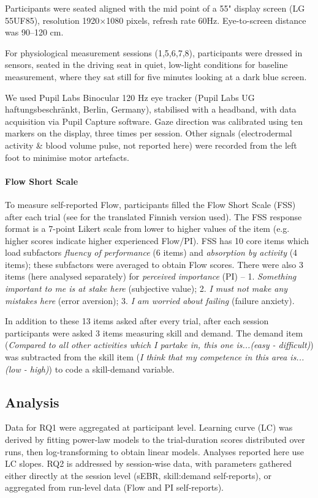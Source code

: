 \documentclass[10pt,letterpaper,floatsintext]{article}
\begin{document}
Participants were seated aligned with the mid point of a 55" display screen (LG 55UF85), resolution 1920$\times$1080 pixels, refresh rate 60Hz. Eye-to-screen distance was 90--120 cm.

For physiological measurement sessions (1,5,6,7,8), participants were dressed in sensors, seated in the driving seat in quiet, low-light conditions for baseline measurement, where they sat still for five minutes looking at a dark blue screen.

We used Pupil Labs Binocular 120 Hz eye tracker (Pupil Labs UG haftungsbeschr\"{a}nkt, Berlin, Germany), stabilised with a headband, with data acquisition via Pupil Capture software. Gaze direction was calibrated using ten markers on the display, three times per session. Other signals (electrodermal activity \& blood volume pulse, not reported here) were recorded from the left foot to minimise motor artefacts.

\paragraph{Flow Short Scale} To measure self-reported Flow, participants filled the Flow Short Scale (FSS) after each trial  (see \citet{Cowley2019flow} for the translated Finnish version used). The FSS response format is a 7-point Likert scale from lower to higher values of the item (e.g. higher scores indicate higher experienced Flow/PI). FSS has 10 core items which load subfactors {\it fluency of performance} (6 items) and {\it absorption by activity} (4 items); these subfactors were averaged to obtain Flow scores. There were also 3 items (here analysed separately) for {\it perceived importance} (PI) -- 1. \textit{Something important to me is at stake here} (subjective value); 2. \textit{I must not make any mistakes here} (error aversion); 3. \textit{I am worried about failing} (failure anxiety).

In addition to these 13 items asked after every trial, after each session participants were asked 3 items measuring skill and demand. The demand item (\textit{Compared to all other activities which I partake in, this one is...(easy - difficult)}) was subtracted from the skill item (\textit{I think that my competence in this area is...(low - high)}) to code a skill-demand variable.


\subsection*{Analysis}
Data for RQ1 were aggregated at participant level. Learning curve (LC) was derived by fitting power-law models to the trial-duration scores distributed over runs, then log-transforming to obtain linear models. Analyses reported here use LC slopes. RQ2 is addressed by session-wise data, with parameters gathered either directly at the session level (sEBR, skill:demand self-reports), or aggregated from run-level data (Flow and PI self-reports).
\end{document}
